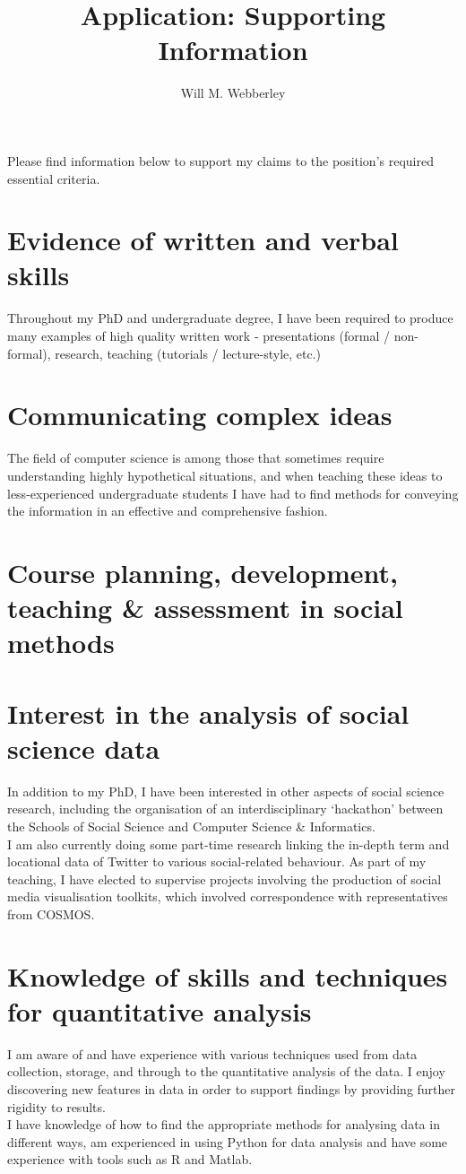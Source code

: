 \documentclass[10pt,a4paper]{article}
\title{Application:	 Supporting Information}
\author{Will M. Webberley}
\date{}
\begin{document}
\maketitle

Please find information below to support my claims to the position's required essential criteria.

\section*{Evidence of written and verbal skills}
Throughout my PhD and undergraduate degree, I have been required to produce many examples of high quality written work
- presentations (formal / non-formal), research, teaching (tutorials / lecture-style, etc.)

\section*{Communicating complex ideas}
The field of computer science is among those that sometimes require understanding highly hypothetical situations, and when teaching these ideas to less-experienced undergraduate students I have had to find methods for conveying the information in an effective and comprehensive fashion.

\section*{Course planning, development, teaching \& assessment in social methods}


\section*{Interest in the analysis of social science data}
In addition to my PhD, I have been interested in other aspects of social science research, including the organisation of an interdisciplinary `hackathon' between the Schools of Social Science and Computer Science \& Informatics.\\
I am also currently doing some part-time research linking the in-depth term and locational data of Twitter to various social-related behaviour. As part of my teaching, I have elected to supervise projects involving the production of social media visualisation toolkits, which involved correspondence with representatives from COSMOS.

\section*{Knowledge of skills and techniques for quantitative analysis}
I am aware of and have experience with various techniques used from data collection, storage, and through to the quantitative analysis of the data. I enjoy discovering new features in data in order to support findings by providing further rigidity to results.\\
I have knowledge of how to find the appropriate methods for analysing data in different ways, am experienced in using Python for data analysis and have some experience with tools such as R and Matlab.
\end{document}

